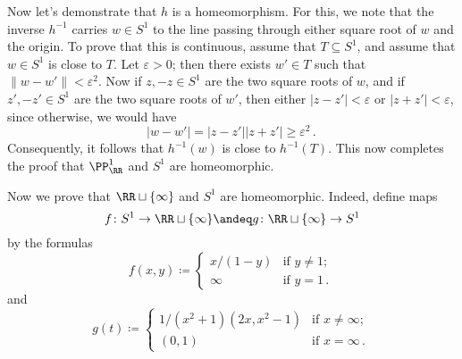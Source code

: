 \begin{exm}
	Now let's demonstrate that $h $ is a homeomorphism.
	For this, we note that the inverse $h^{-1}$ carries $w \in S^1$ to the line passing through either square root of $w$ and the origin.
	To prove that this is continuous, assume that $T \subseteq S^1$, and assume that $w \in S^1$ is close to $T$.
	Let $\varepsilon>0$;
	then there exists $w' \in T$ such that $\|w-w'\| < \varepsilon^2$.
	Now if $z, -z \in S^1$ are the two square roots of $w$, and if $z', -z' \in S^1$ are the two square roots of $w'$, then either $|z-z'|<\varepsilon$ or $|z+z'|<\varepsilon$, since
	otherwise, we would have
	\[
		|w-w'| = |z-z'| |z+z'| \geq \varepsilon^2 \period
	\]
	Consequently, it follows that $h^{-1}(w)$ is close to $h^{-1}(T)$.
	This now completes the proof that $\PP^1_{\RR}$ and $S^1$ are homeomorphic.

	Now we prove that $\RR \sqcup \{\infty\}$ and $S^1$ are homeomorphic.
	Indeed, define maps
	\[
		f \colon S^1 \to \RR \sqcup \{\infty\} \andeq g \colon \RR \sqcup \{\infty\} \to S^1
	\]
	by the formulas
	\[
		f(x,y) \coloneq \begin{cases}
			x/(1-y) & \text{if } y \neq 1 \semicolon \\
			\infty & \text{if } y = 1 \period
		\end{cases}
	\]
	and
	\[
		g(t) \coloneq \begin{cases}
			1/(x^2+1)(2x, x^2-1) & \text{if } x \neq \infty \semicolon \\
			(0,1) & \text{if } x = \infty \period
		\end{cases}
	\]
\end{exm}


